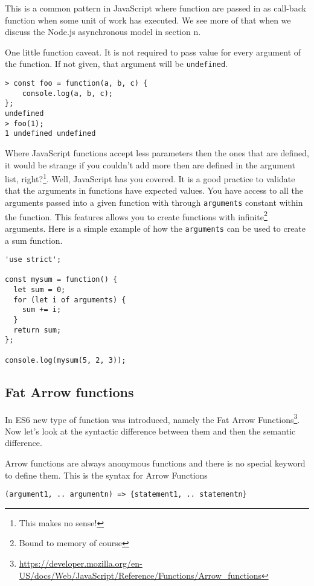 This is a common pattern in JavaScript where function are passed in as call-back function when some unit of work has executed. We see more of that when we discuss the Node.js asynchronous model in section n.

One little function caveat. It is not required to pass value for every argument of the function. If not given, that argument will be \texttt{undefined}.

\begin{lstlisting}
> const foo = function(a, b, c) {
    console.log(a, b, c);
};
undefined
> foo(1);
1 undefined undefined
\end{lstlisting}

Where JavaScript functions accept less parameters then the ones that are defined, it would be strange if you couldn't add more then are defined in the argument list, right?\footnote{This makes no sense!}. Well, JavaScript has you covered. It is a good practice to validate that the arguments in functions have expected values. You have access to all the arguments passed into a given function with through \texttt{arguments} constant within the function. This features allows you to create functions with infinite\footnote{Bound to memory of course} arguments. Here is a simple example of how the \texttt{arguments} can be used to create a sum function.

\begin{lstlisting}
'use strict';

const mysum = function() {
  let sum = 0;
  for (let i of arguments) {
    sum += i;
  }
  return sum;
};

console.log(mysum(5, 2, 3));
\end{lstlisting}

\subsection{Fat Arrow functions}
In ES6 new type of function was introduced, namely the Fat Arrow Functions\footnote{\url{https://developer.mozilla.org/en-US/docs/Web/JavaScript/Reference/Functions/Arrow_functions}}. Now let's look at the syntactic difference between them and then the semantic difference.

Arrow functions are always anonymous functions and there is no special keyword to define them. This is the syntax for Arrow Functions

\begin{lstlisting}
(argument1, .. argumentn) => {statement1, .. statementn}
\end{lstlisting}

